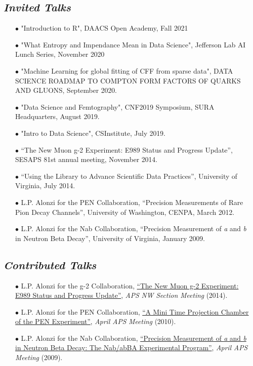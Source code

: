 \documentclass{article}[10pt]
\begin{document}
\subsection*{\emph{Invited Talks}}

\begin{itemize}
\item [$\bullet$] "Introduction to R", DAACS Open Academy, Fall 2021
\item [$\bullet$] "What Entropy and Impendance Mean in Data Science", Jefferson Lab AI Lunch Series, November 2020
\item [$\bullet$] "Machine Learning for global fitting of CFF from sparse data​", DATA SCIENCE ROADMAP TO COMPTON FORM FACTORS OF QUARKS AND GLUONS, September 2020.
\item [$\bullet$] "Data Science and Femtography", CNF2019 Symposium, SURA Headquarters, August 2019.
\item [$\bullet$] "Intro to Data Science", CSInstitute, July 2019.
\item [$\bullet$] ``The New Muon g-2 Experiment: E989 Status and Progress Update'', SESAPS 81st annual meeting, November 2014.
\item [$\bullet$] ``Using the Library to Advance Scientific Data Practices'', University of Virginia, July 2014.
\item [$\bullet$] L.P. Alonzi for the PEN Collaboration, ``Precision Measurements of Rare Pion Decay Channels'', University of Washington, CENPA, March 2012.
\item [$\bullet$] L.P. Alonzi for the Nab Collaboration, ``Precision Measurement of \emph{a} and \emph{b} in Neutron Beta Decay'', University of Virginia, January 2009.
\end{itemize}

\subsection*{\emph{Contributed Talks}}
\begin{itemize}
\item [$\bullet$] L.P. Alonzi for the g-2 Collaboration, \href{http://pen.phys.virginia.edu/lpa2a-docs/2014-05-02-Alonzi-APSNWSection.pdf}{``The New Muon g-2 Experiment: E989 Status and Progress Update''}, \emph{APS NW Section Meeting} (2014).
\item [$\bullet$] L.P. Alonzi for the PEN Collaboration, \href{http://pen.phys.virginia.edu/talks/2010_April_APS_alonzi.pdf}{``A Mini Time Projection Chamber of the PEN Experiment''}, \emph{April APS Meeting} (2010).
\item [$\bullet$] L.P. Alonzi for the Nab Collaboration, \href{http://nab.phys.virginia.edu/slides/2009_April_APS_Alonzi.pdf}{``Precision Measurement of \emph{a} and \emph{b} in Neutron Beta Decay: The Nab/abBA Experimental Program''}, \emph{April APS Meeting} (2009).
\end{itemize}
\end{document}
